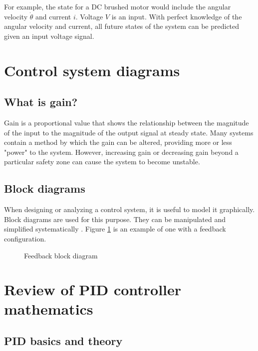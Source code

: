 \documentclass[10pt,conference,compsoc]{IEEEtran}
\begin{document}
\noindent For example, the \gls{state} for a DC brushed motor would include the
angular velocity $\dot{\theta}$ and current $i$. Voltage $V$ is an input. With
perfect knowledge of the angular velocity and current, all future states of the
system can be predicted given an input voltage signal. \\

\section{Control system diagrams}

\subsection{What is gain?}

\noindent Gain is a proportional value that shows the relationship between the
magnitude of the input to the magnitude of the output signal at steady state.
Many systems contain a method by which the gain can be altered, providing more
or less "power" to the system. However, increasing gain or decreasing gain
beyond a particular safety zone can cause the system to become unstable.

\subsection{Block diagrams}

\noindent When designing or analyzing a control system, it is useful to model it
graphically. Block diagrams are used for this purpose. They can be manipulated
and simplified systematically \cite{bib:block_diagrams}. Figure
\ref{fig:feedback_loop} is an example of one with a feedback configuration.

\begin{figure}[H]
  \centering
  \def\svgwidth{0.5\columnwidth}
  
  \caption{Feedback block diagram}
  \label{fig:feedback_loop}
\end{figure}

\section{Review of PID controller mathematics}

\subsection{PID basics and theory}
\end{document}
